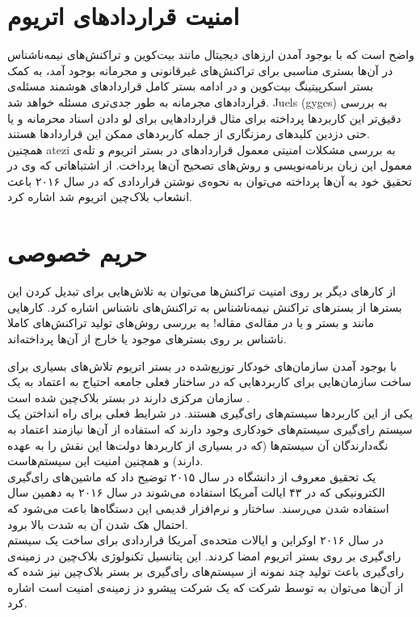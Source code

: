 \section{امنیت قرارداد‌های اتریوم}

واضح است که با بوجود آمدن ارزهای دیجیتال مانند بیت‌کوین و تراکنش‌های نیمه‌ناشناس در آن‌ها بستری مناسبی برای تراکنش‌های غیرقانونی و مجرمانه بوجود آمد، به کمک بستر اسکرپیتینگ بیت‌کوین و در ادامه بستر کامل قرارداد‌های هوشمند مسئله‌ی قرارداد‌های مجرمانه به طور جدی‌تری مسئله خواهد شد. Juels (gyges) به بررسی دقیق‌تر این کاربردها پرداخته برای مثال قراردادهایی برای لو دادن اسناد محرمانه و یا حتی دزدین کلید‌های رمزنگاری از جمله کاربرد‌های ممکن این قراردادها هستند. 
\\
همچنین atezi به بررسی مشکلات امنیتی معمول قراردادهای در بستر اتریوم و تله‌ی معمول این زبان برنامه‌نویسی و روش‌های تصحیح آن‌ها پرداخت. از اشتباهاتی که وی در تحقیق خود به آن‌ها پرداخته می‌توان به نحوه‌ی نوشتن قراردادی که در سال ۲۰۱۶ باعث انشعاب بلاک‌چین اتریوم شد اشاره کرد. 
 
\section{حریم خصوصی}
از کارهای دیگر بر روی امنیت تراکنش‌ها می‌توان به تلاش‌هایی برای تبدیل کردن این بستر‌ها از بسترهای تراکنش نیمه‌ناشناس به تراکنش‌های ناشناس اشاره کرد. کارهایی مانند 
و بستر 
و یا 
در مقاله‌ی مقاله! به بررسی روش‌های تولید تراکنش‌های کاملا ناشناس بر روی بستر‌های موجود یا خارج از آن‌ها پرداخته‌اند. 

با بوجود آمدن سازمان‌های خودکار توزیع‌شده در بستر اتریوم تلاش‌های بسیاری برای ساخت سازمان‌هایی برای کاربردهایی که در ساختار فعلی جامعه‌ احتیاج به اعتماد به یک سازمان مرکزی دارند در بستر بلاک‌چین شده است .
\\
یکی از این کاربردها سیستم‌های رای‌گیری هستند. در شرایط فعلی برای راه انداختن یک سیستم رای‌گیری سیستم‌های خودکاری وجود دارند که استفاده‌ از آن‌ها نیازمند اعتماد به نگه‌دارندگان آن سیستم‌ها (که در بسیاری از کاربردها دولت‌ها این نقش را به عهده دارند) و همچنین امنیت‌ این سیستم‌هاست. 
\\
یک تحقیق معروف از دانشگاه‌  در سال ۲۰۱۵ توضیح داد که ماشین‌های رای‌گیری الکترونیکی که در ۴۳ ایالت آمریکا استفاده می‌شوند در سال ۲۰۱۶ به دهمین سال استفاده شدن می‌رسند. ساختار و نرم‌افزار قدیمی این دستگاه‌ها باعت می‌شود که احتمال هک شدن آن‌ به شدت بالا برود. 
\\
در سال ۲۰۱۶  اوکراین و ایالات متحده‌ی آمریکا قراردادی برای ساخت یک سیستم‌ رای‌گیری بر روی بستر اتریوم امضا کردند. این پتانسیل تکنولوژی بلاک‌چین در زمینه‌ی رای‌گیری باعث تولید چند نمونه از سیستم‌های رای‌گیری بر بستر بلاک‌چین نیز شده که از آن‌ها می‌توان به 
توسط شرکت 
که یک شرکت پیشرو دز زمینه‌ی امنیت است اشاره کرد.

